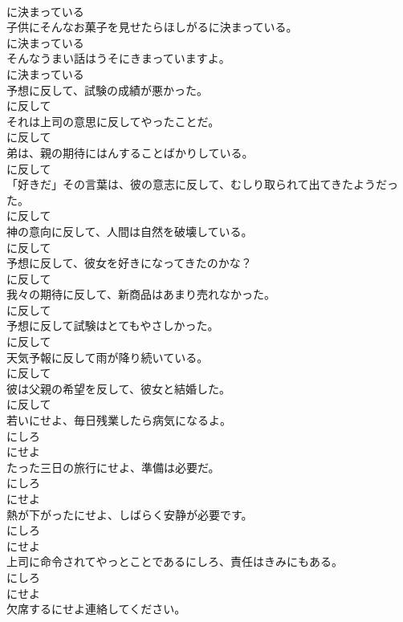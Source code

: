 \documentclass[8pt]{extreport}
\begin{document}
\begin{CJK}{UTF8}{min}
\\	に決まっている
\\	子供にそんなお菓子を見せたらほしがるに決まっている。	
\\	に決まっている
\\	そんなうまい話はうそにきまっていますよ。	
\\	に決まっている
\\	予想に反して、試験の成績が悪かった。	
\\	に反して
\\	それは上司の意思に反してやったことだ。	
\\	に反して
\\	弟は、親の期待にはんすることばかりしている。	
\\	に反して
\\	「好きだ」その言葉は、彼の意志に反して、むしり取られて出てきたようだった。	
\\	に反して
\\	神の意向に反して、人間は自然を破壊している。	
\\	に反して
\\	予想に反して、彼女を好きになってきたのかな？	
\\	に反して
\\	我々の期待に反して、新商品はあまり売れなかった。	
\\	に反して
\\	予想に反して試験はとてもやさしかった。	
\\	に反して
\\	天気予報に反して雨が降り続いている。	
\\	に反して
\\	彼は父親の希望を反して、彼女と結婚した。	
\\	に反して
\\	若いにせよ、毎日残業したら病気になるよ。	
\\	にしろ 
\\	にせよ
\\	たった三日の旅行にせよ、準備は必要だ。	
\\	にしろ 
\\	にせよ
\\	熱が下がったにせよ、しばらく安静が必要です。	
\\	にしろ 
\\	にせよ
\\	上司に命令されてやっとことであるにしろ、責任はきみにもある。	
\\	にしろ 
\\	にせよ
\\	欠席するにせよ連絡してください。	

\end{CJK}
\end{document}
